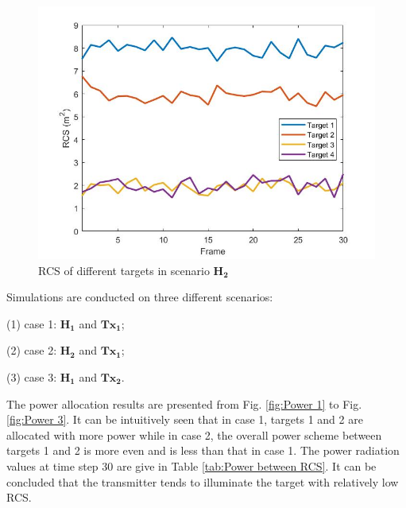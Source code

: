 \documentclass[12pt,journal,draftclsnofoot,onecolumn]{IEEEtran}
\begin{document}
\begin{figure}
	\centering
	\includegraphics[scale=0.36]{RCS.jpg}
	\caption{RCS of different targets in scenario $\mathbf{H_2}$}
	\label{fig:RCS}
\end{figure}

Simulations are conducted on three different scenarios:

(1) case 1: $\mathbf{H_1}$ and $\mathbf{Tx_1}$;

(2) case 2: $\mathbf{H_2}$ and $\mathbf{Tx_1}$;

(3) case 3: $\mathbf{H_1}$ and $\mathbf{Tx_2}$.

The power allocation results are presented from Fig. \ref{fig:Power 1} to Fig. \ref{fig:Power 3}. %
 It can be intuitively seen that in case 1, targets 1 and 2 are allocated with more power while in case 2, the overall power scheme between targets 1 and 2 is more even and is less than that in case 1. %
  The power radiation values at time step 30 are give in Table \ref{tab:Power between RCS}. It can be concluded that the transmitter tends to illuminate the target with relatively low RCS.
\end{document}
